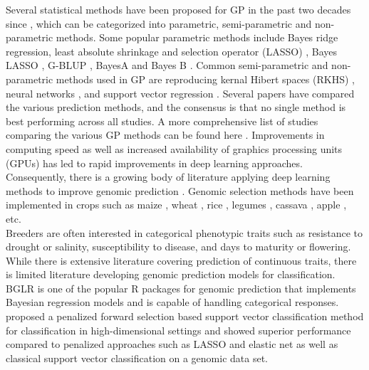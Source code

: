 Several statistical methods have been proposed for GP in the past two decades since \cite{meuwissen_prediction_2001}, which can be categorized into parametric, semi-parametric and non-parametric methods. Some popular parametric methods include Bayes ridge regression, least absolute shrinkage and selection operator (LASSO) \cite{tibshirani1996}, Bayes LASSO \cite{park_casella_2008}, G-BLUP \cite{hayes_accuracy_2009}, BayesA and Bayes B \cite{meuwissen_prediction_2001}. Common semi-parametric and non-parametric methods used in GP are reproducing kernal Hibert spaces (RKHS) \cite{gianola_genomic-assisted_2006, de_los_campos_semi-parametric_2010}, neural networks \cite{gianola_genomic-assisted_2006, gianola_predicting_2011, gonzalez_camacho_2012, perez_rodriguez_2012}, and support vector regression \cite{james_introduction_2013}. Several papers \cite{de_los_campos_2013, heslot_2012, azodi_benchmarking_2019, reka_howard_2014, crain_2018, haroldo_neves_2012, li_zhang_2018} have compared the various prediction methods, and the consensus is that no single method is best performing across all studies. A more comprehensive list of studies comparing the various GP methods can be found here \cite{de_los_campos_2013, montesinos_lopez_2021}. Improvements in computing speed as well as increased availability of graphics processing units (GPUs) has led to rapid improvements in deep learning approaches. Consequently, there is a growing body of literature applying deep learning methods to improve genomic prediction \cite{azodi_benchmarking_2019, montesinos_lopez_2018, montesinos-lopez_new_2019, montesinos_lopez_2021, li_zhang_2018, bellot_2018}. Genomic selection methods have been implemented in crops such as maize \cite{windhausen_2012, perez_rodriguez_2012, crossa_genomic_2014}, wheat \cite{crain_2018, haile_2018, jarquin_increasing_2017}, rice \cite{du_genomic_2018, Xu_rice_2014, spindel2015genomic, zeng2017rational}, legumes \cite{roorkiwal_genome-enabled_2016, roorkiwal_genomic-enabled_2018, burstin2015genetic, varshney2018accelerating}, cassava \cite{okeke2017accuracies, de_oliviera_2012}, apple \cite{roth2020genomic}, etc. \\

Breeders are often interested in categorical phenotypic traits such as resistance to drought or salinity, susceptibility to disease, and days to maturity or flowering. While there is extensive literature covering prediction of continuous traits, there is limited literature developing genomic prediction models for classification. BGLR \cite{perez2014genome} is one of the popular R \cite{Rcite} packages for genomic prediction that implements Bayesian regression models and is capable of handling categorical responses. \cite{ghosal_sparse_2016} proposed a penalized forward selection based support vector classification method for classification in high-dimensional settings and showed superior performance compared to penalized approaches such as LASSO and elastic net as well as classical support vector classification on a genomic data set. \\ 


